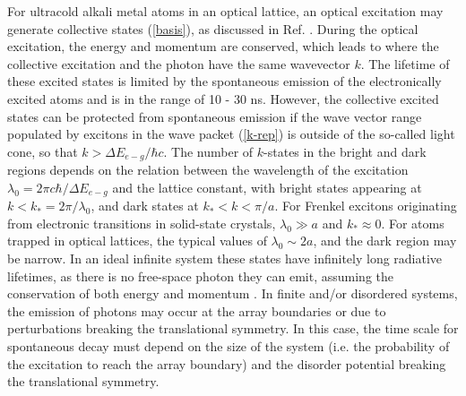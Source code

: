 For ultracold alkali metal atoms in an optical lattice, an optical excitation may generate collective states (\ref{basis}),
as discussed in Ref. \cite{electronic-exciton1, electronic-exciton2}.
During the optical excitation, the energy and momentum are conserved, which leads to 
where the collective excitation and the photon have the same wavevector $k$. 
The lifetime of these excited states is limited by the spontaneous emission of the electronically excited atoms and is
in the range of 10 - 30 ns.
However, the collective excited states can be protected from spontaneous emission if the wave vector range populated by excitons in the wave packet (\ref{k-rep}) is
outside of the so-called light cone, so that $k >\Delta E_{e-g}/\hbar c$.  
The number of $k$-states in the bright and dark regions depends on the relation between the wavelength of the 
excitation $\lambda_0 = 2\pi c \hbar / \Delta E_{e-g} $ and the lattice constant, with bright states appearing at $k < k_* = 2\pi / \lambda_0$, and dark
states at $k_* < k < \pi/a$. For Frenkel excitons originating from electronic transitions in solid-state crystals, $\lambda_0 \gg a$ and $k_*
\approx 0$. For atoms trapped in optical lattices, the typical values of $\lambda_0 \sim 2a$, and the dark region may be narrow. 
 In an ideal infinite system these states have infinitely long radiative lifetimes, as there is no free-space 
photon they can emit, assuming the conservation of both energy and momentum \cite{electronic-exciton1, 
electronic-exciton2, agranovich1966, agranovich}.
In finite and/or disordered systems, the emission of photons may occur at the array boundaries or due to perturbations 
breaking the translational symmetry. In this case, the time scale for spontaneous decay must depend on 
the size of the system (i.e. the probability of the excitation to reach the array boundary) and the disorder potential 
breaking the translational symmetry.  

